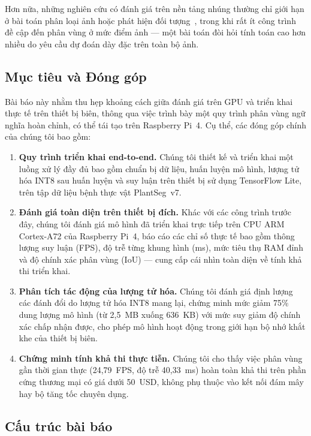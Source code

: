 \documentclass[conference]{IEEEtran}
\begin{document}
Hơn nữa, những nghiên cứu có đánh giá trên nền tảng nhúng thường chỉ giới hạn ở bài toán phân loại ảnh hoặc phát hiện đối tượng~\cite{han2015learning, hinton2015distilling}, trong khi rất ít công trình đề cập đến phân vùng ở mức điểm ảnh --- một bài toán đòi hỏi tính toán cao hơn nhiều do yêu cầu dự đoán dày đặc trên toàn bộ ảnh.

\subsection{Mục tiêu và Đóng góp}

Bài báo này nhằm thu hẹp khoảng cách giữa đánh giá trên GPU và triển khai thực tế trên thiết bị biên, thông qua việc trình bày một quy trình phân vùng ngữ nghĩa hoàn chỉnh, có thể tái tạo trên Raspberry Pi~4. Cụ thể, các đóng góp chính của chúng tôi bao gồm:
\begin{enumerate}
  \item \textbf{Quy trình triển khai end-to-end.} Chúng tôi thiết kế và triển khai một luồng xử lý đầy đủ bao gồm chuẩn bị dữ liệu, huấn luyện mô hình, lượng tử hóa INT8 sau huấn luyện và suy luận trên thiết bị sử dụng TensorFlow Lite, trên tập dữ liệu bệnh thực vật PlantSeg~v7.
  \item \textbf{Đánh giá toàn diện trên thiết bị đích.} Khác với các công trình trước đây, chúng tôi đánh giá mô hình đã triển khai trực tiếp trên CPU ARM Cortex-A72 của Raspberry Pi~4, báo cáo các chỉ số thực tế bao gồm thông lượng suy luận (FPS), độ trễ từng khung hình (ms), mức tiêu thụ RAM đỉnh và độ chính xác phân vùng (IoU) --- cung cấp cái nhìn toàn diện về tính khả thi triển khai.
  \item \textbf{Phân tích tác động của lượng tử hóa.} Chúng tôi đánh giá định lượng các đánh đổi do lượng tử hóa INT8 mang lại, chứng minh mức giảm 75\% dung lượng mô hình (từ 2,5~MB xuống 636~KB) với mức suy giảm độ chính xác chấp nhận được, cho phép mô hình hoạt động trong giới hạn bộ nhớ khắt khe của thiết bị biên.
  \item \textbf{Chứng minh tính khả thi thực tiễn.} Chúng tôi cho thấy việc phân vùng gần thời gian thực (24,79~FPS, độ trễ 40,33~ms) hoàn toàn khả thi trên phần cứng thương mại có giá dưới 50~USD, không phụ thuộc vào kết nối đám mây hay bộ tăng tốc chuyên dụng.
\end{enumerate}

\subsection{Cấu trúc bài báo}
\end{document}
